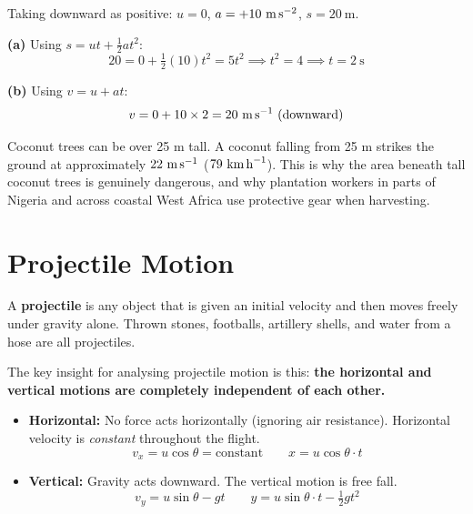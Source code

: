 \begin{solutionbox}
Taking downward as positive: $u = 0$, $a = +10\ \text{m\,s}^{-2}$,
$s = 20\ \text{m}$.

\textbf{(a)} Using $s = ut + \frac{1}{2}at^2$:
\[
  20 = 0 + \tfrac{1}{2}(10)t^2
  = 5t^2
  \implies t^2 = 4
  \implies t = 2\ \text{s}
\]

\textbf{(b)} Using $v = u + at$:
\[
  v = 0 + 10 \times 2 = 20\ \text{m\,s}^{-1}
  \text{ (downward)}
\]

\begin{realworldbox}
Coconut trees can be over 25 m tall. A coconut falling
from 25 m strikes the ground at approximately
$22\ \text{m\,s}^{-1}$ ($79\ \text{km\,h}^{-1}$).
This is why the area beneath tall coconut trees is
genuinely dangerous, and why plantation workers in
parts of Nigeria and across coastal West Africa use
protective gear when harvesting.
\end{realworldbox}
\end{solutionbox}

\section{Projectile Motion}

A \textbf{projectile} is any object that is given an
initial velocity and then moves freely under gravity
alone. Thrown stones, footballs, artillery shells, and
water from a hose are all projectiles.

The key insight for analysing projectile motion is this:
\textbf{the horizontal and vertical motions are completely
independent of each other.}

\begin{keybox}
\begin{itemize}[noitemsep]
  \item \textbf{Horizontal:} No force acts horizontally
  (ignoring air resistance). Horizontal velocity is
  \textit{constant} throughout the flight.
  \[
    v_x = u\cos\theta = \text{constant}
    \qquad x = u\cos\theta \cdot t
  \]
  \item \textbf{Vertical:} Gravity acts downward.
  The vertical motion is free fall.
  \[
    v_y = u\sin\theta - gt
    \qquad y = u\sin\theta \cdot t - \tfrac{1}{2}gt^2
  \]
\end{itemize}
\end{keybox}

